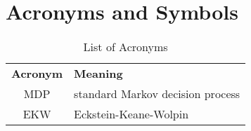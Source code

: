 \section{Acronyms and Symbols}\label{List of Symbols}
\bgroup
\def\arraystretch{1.5}%
\tabulinesep=4.0mm
\begin{longtabu} to \textwidth{CL}
\caption{List of Acronyms}
\setlength\extrarowheight{0pt}\\ %
\bottomrule
\textbf{Acronym} & \textbf{Meaning} \\\midrule
\endhead
\bottomrule
\endfoot
MDP                 & standard Markov decision process \\
EKW                 & Eckstein-Keane-Wolpin
\end{longtabu}
\egroup

